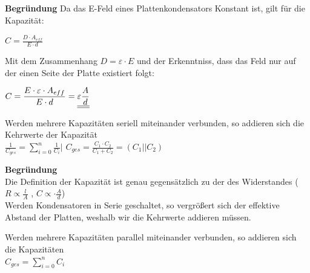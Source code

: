 					\iend

					\textbf{Begründung}
					Da das E-Feld eines Plattenkondensators Konstant ist, gilt für die Kapazität:
					\fix
					\fix
					\begin{center}
						$ C= \displaystyle \frac{D \cdot A_{eff} } {E \cdot d} $
					\end{center}
					\fix
					\fix
					Mit dem Zusammenhang $ D = \varepsilon \cdot E$ und der Erkenntniss, dass das Feld nur auf der einen Seite der Platte existiert folgt:
					\fix \fix
					\begin{center}
						$ C= \displaystyle \frac{E \cdot \varepsilon \cdot A_{eff} } {E  \cdot d}  = \underline{\underline{\displaystyle \varepsilon \frac{A} { d}}}$
					\end{center}




										\beginip
										Werden mehrere Kapazitäten seriell miteinander verbunden, so addieren sich die Kehrwerte der Kapazität \\
										\formulaBegin
										$\displaystyle \frac{1}{C_{ges}} = \sum_{i=0}^n \frac{1}{C_i} \Bigg\rvert$
										$\displaystyle C_{ges} = \frac{C_1 \cdot C_2}{C_1 + C_2} = (C_1 || C_2)$
										\formulaEnd
										\iend


										\textbf{Begründung} \\
										 	Die Definition der Kapazität ist genau gegensätzlich zu der des Widerstandes ($ R \propto \frac{l}{A}$ , $ C \propto \cdot \frac{A}{d} $)\\
											 Werden Kondensatoren in Serie geschaltet, so vergrößert sich der effektive Abstand der Platten, weshalb wir die Kehrwerte addieren müssen. \\




											\beginip
											Werden mehrere Kapazitäten parallel miteinander verbunden, so addieren sich die Kapazitäten \\
											\formulaBegin
											$\displaystyle C_{ges} = \sum_{i=0}^n C_i $
											\formulaEnd
											\iend

